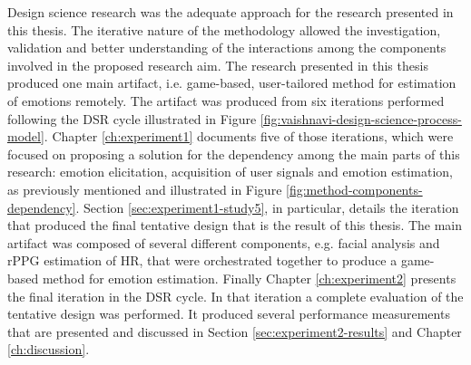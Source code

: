Design science research was the adequate approach for the research presented in this thesis. The iterative nature of the methodology allowed the investigation, validation and better understanding of the interactions among the components involved in the proposed research aim. The research presented in this thesis produced one main artifact, i.e. game-based, user-tailored method for estimation of emotions remotely. The artifact was produced from six iterations performed following the DSR cycle illustrated in Figure \ref{fig:vaishnavi-design-science-process-model}. Chapter \ref{ch:experiment1} documents five of those iterations, which were focused on proposing a solution for the dependency among the main parts of this research: emotion elicitation, acquisition of user signals and emotion estimation, as previously mentioned and illustrated in Figure \ref{fig:method-components-dependency}. Section \ref{sec:experiment1-study5}, in particular, details the iteration that produced the final tentative design that is the result of this thesis. The main artifact was composed of several different components, e.g. facial analysis and rPPG estimation of HR, that were orchestrated together to produce a game-based method for emotion estimation. Finally Chapter \ref{ch:experiment2} presents the final iteration in the DSR cycle. In that iteration a complete evaluation of the tentative design was performed. It produced several performance measurements that are presented and discussed in Section \ref{sec:experiment2-results} and Chapter \ref{ch:discussion}.




